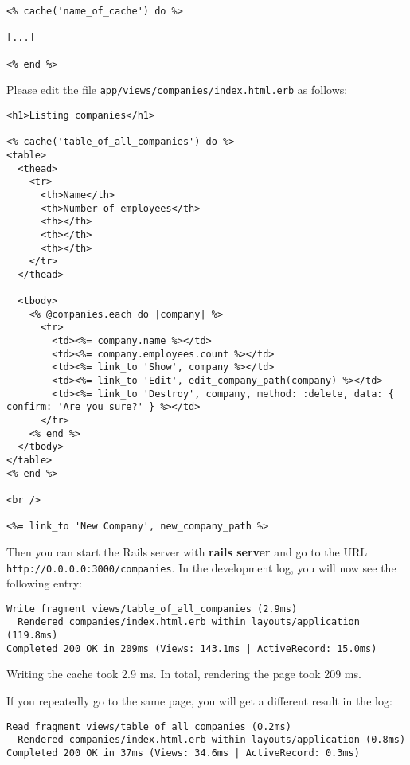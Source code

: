 \documentclass[a4paper]{book}
\newcounter{tab}[chapter]
\begin{document}
\begin{shaded}\begin{verbatim}
<% cache('name_of_cache') do %>

[...]

<% end %>
\end{verbatim}\end{shaded}

Please edit the file \texttt{app/views/companies/index.html.erb} as follows:

\begin{shaded}\begin{verbatim}
<h1>Listing companies</h1>

<% cache('table_of_all_companies') do %>
<table>
  <thead>
    <tr>
      <th>Name</th>
      <th>Number of employees</th>
      <th></th>
      <th></th>
      <th></th>
    </tr>
  </thead>

  <tbody>
    <% @companies.each do |company| %>
      <tr>
        <td><%= company.name %></td>
        <td><%= company.employees.count %></td>
        <td><%= link_to 'Show', company %></td>
        <td><%= link_to 'Edit', edit_company_path(company) %></td>
        <td><%= link_to 'Destroy', company, method: :delete, data: { confirm: 'Are you sure?' } %></td>
      </tr>
    <% end %>
  </tbody>
</table>
<% end %>

<br />

<%= link_to 'New Company', new_company_path %>
\end{verbatim}\end{shaded}

Then you can start the Rails server with \textbf{rails server} and go to the URL \texttt{http://0.0.0.0:3000/companies}. In the development log, you will now see the following entry:

\begin{shaded}\begin{verbatim}
Write fragment views/table_of_all_companies (2.9ms)
  Rendered companies/index.html.erb within layouts/application (119.8ms)
Completed 200 OK in 209ms (Views: 143.1ms | ActiveRecord: 15.0ms)
\end{verbatim}\end{shaded}

Writing the cache took 2.9 ms. In total, rendering the page took 209 ms.

If you repeatedly go to the same page, you will get a different result in the log:

\begin{shaded}\begin{verbatim}
Read fragment views/table_of_all_companies (0.2ms)
  Rendered companies/index.html.erb within layouts/application (0.8ms)
Completed 200 OK in 37ms (Views: 34.6ms | ActiveRecord: 0.3ms)
\end{verbatim}\end{shaded}
\end{document}
